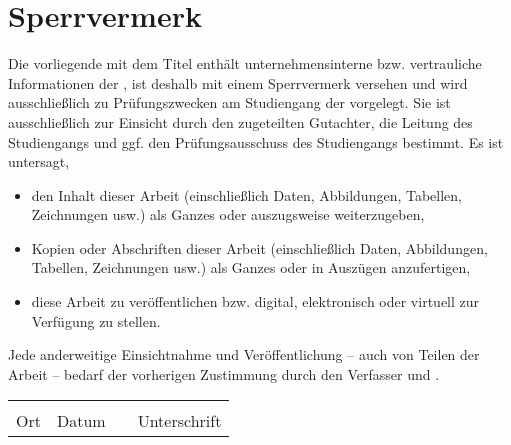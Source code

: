 \thispagestyle{empty}
\section*{Sperrvermerk}

\vspace*{2em}

  Die vorliegende {\vartype} mit dem Titel {\itshape{}\vartitle{}\/} enthält unternehmensinterne bzw. vertrauliche Informationen der {\varcompany}, ist deshalb mit einem Sperrvermerk versehen und wird ausschließlich zu Prüfungszwecken am Studiengang {\varcourseofstudies} der {\varuniversity} vorgelegt. Sie ist ausschließlich zur Einsicht durch den zugeteilten Gutachter, die Leitung des Studiengangs und ggf. den Prüfungsausschuss des Studiengangs bestimmt.  Es ist untersagt,
  \begin{itemize}
  \item den Inhalt dieser Arbeit (einschließlich Daten, Abbildungen, Tabellen, Zeichnungen usw.) als Ganzes oder auszugsweise weiterzugeben,
  \item Kopien oder Abschriften dieser Arbeit (einschließlich Daten, Abbildungen, Tabellen, Zeichnungen usw.) als Ganzes oder in Auszügen anzufertigen,
  \item diese Arbeit zu veröffentlichen bzw. digital, elektronisch oder virtuell zur Verfügung zu stellen. 
  \end{itemize}
Jede anderweitige Einsichtnahme und Veröffentlichung – auch von Teilen der Arbeit – bedarf der vorherigen Zustimmung durch den Verfasser und {\varcompany}.

\vspace{3em}

\begin{tabular}{ p{3cm}p{3cm}p{1cm}p{5cm} }
        \hrulefill & \hrulefill & & \hrulefill\\
        Ort & Datum & & Unterschrift\\
\end{tabular}
